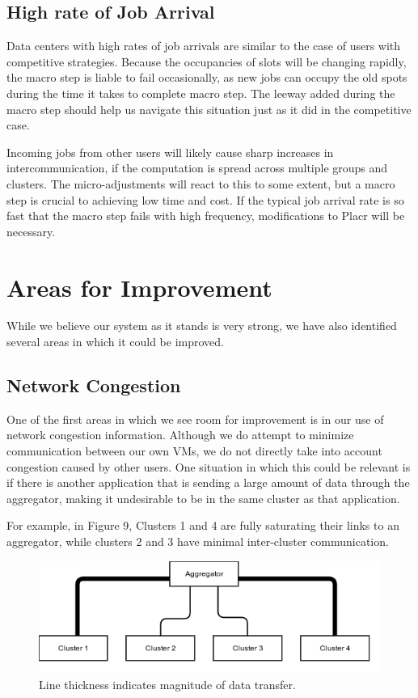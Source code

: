 \documentclass[11pt]{article}
\begin{document}
\subsection{High rate of Job Arrival}

Data centers with high rates of job arrivals are similar to the case of users with competitive strategies.  Because the occupancies of slots will be changing rapidly, the macro step is liable to fail occasionally, as new jobs can occupy the old spots during the time it takes to complete macro step. The leeway added during the macro step should help us navigate this situation just as it did in the competitive case.

Incoming jobs from other users will likely cause sharp increases in intercommunication, if the computation is spread across multiple groups and clusters.  The micro-adjustments will react to this to some extent, but a macro step is crucial to achieving low time and cost.  If the typical job arrival rate is so fast that the macro step fails with high frequency, modifications to Placr will be necessary.

\section{Areas for Improvement}

While we believe our system as it stands is very strong, we have also identified several areas in which it could be improved.

\subsection{Network Congestion}

One of the first areas in which we see room for improvement is in our use of network congestion information. Although we do attempt to minimize communication between our own VMs, we do not directly take into account congestion caused by other users.  One situation in which this could be relevant is if there is another application that is sending a large amount of data through the aggregator, making it undesirable to be in the same cluster as that application.

For example, in Figure 9, Clusters 1 and 4 are fully saturating their links to an aggregator, while clusters 2 and 3 have minimal inter-cluster communication.

\begin{figure}
  \centering
\includegraphics[scale=0.7]{cluster_congestion.png}

 \caption{Line thickness indicates magnitude of data transfer.}
 
 \end{figure}
 
\end{document}
